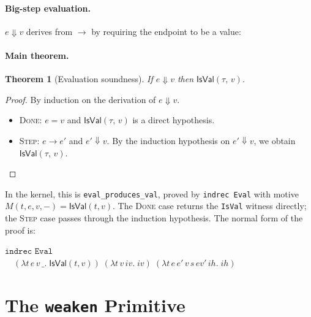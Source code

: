 \documentclass[10pt,a4paper]{article}
\newcommand{\IsVal}[2]{\mathsf{IsVal}(#1,\,#2)} %
\newcommand{\step}{\to}
\newcommand{\eval}{\Downarrow}
\theoremstyle{plain}
\newtheorem{theorem}{Theorem}
\theoremstyle{definition}
\theoremstyle{remark}
\begin{document}
\paragraph{Big-step evaluation.}
$e \eval v$ derives from $\step$ by requiring the endpoint to be a value:

\paragraph{Main theorem.}

\begin{theorem}[Evaluation soundness]\label{thm:sound}
If\/ $e \eval v$ then $\IsVal{\tau}{v}$.
\end{theorem}
\begin{proof}
By induction on the derivation of $e \eval v$.
\begin{itemize}\itemsep2pt
  \item \textsc{Done}: $e = v$ and $\IsVal{\tau}{v}$ is a direct hypothesis.
  \item \textsc{Step}: $e \step e'$ and $e' \eval v$.
        By the induction hypothesis on $e' \eval v$, we obtain
        $\IsVal{\tau}{v}$. \qedhere
\end{itemize}
\end{proof}

\noindent
In the kernel, this is \texttt{eval\_produces\_val}, proved by
\texttt{indrec Eval} with motive $M(t,e,v,-) = \mathsf{IsVal}(t,v)$.
The \textsc{Done} case returns the \texttt{IsVal} witness directly;
the \textsc{Step} case passes through the induction hypothesis.
The normal form of the proof is:
\begin{center}
\small
$\texttt{indrec Eval}$\\[2pt]
$\quad(\lambda t\,e\,v\,\_.\;\mathsf{IsVal}(t,v))\;
(\lambda t\,v\,\mathit{iv}.\;\mathit{iv})\;
(\lambda t\,e\,e'\,v\,s\,\mathit{ev'}\,\mathit{ih}.\;\mathit{ih})$
\end{center}

\section{The \texttt{weaken} Primitive}
\label{sec:weaken}
\end{document}
